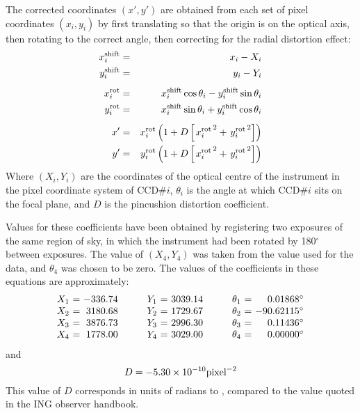 \documentclass[twoside,11pt]{starlink}
\begin{document}
The corrected coordinates $(x', y')$ are obtained from
each set of pixel coordinates $(x_i, y_i)$
by first translating so that the origin is on the optical
axis, then rotating to the correct angle,
then correcting for the radial distortion effect:
\begin{eqnarray*}
  x_i^{\rm shift} & = & x_i - X_i \\
  y_i^{\rm shift} & = & y_i - Y_i \\[1ex]
%
  x_i^{\rm rot}   & = & x_i^{\rm shift} \cos \theta_i
                      - y_i^{\rm shift} \sin \theta_i  \\
  y_i^{\rm rot}   & = & x_i^{\rm shift} \sin \theta_i
                      + y_i^{\rm shift} \cos \theta_i  \\[1ex]
%
  x'              & = & x_i^{\rm rot}
                        \left( 1 + D \left[ \left. x_i^{\rm rot} \right.^2
                                          + \left. y_i^{\rm rot} \right.^2
                                     \right] \right)  \\
  y'              & = & y_i^{\rm rot}
                        \left( 1 + D \left[ \left. x_i^{\rm rot} \right.^2
                                          + \left. y_i^{\rm rot} \right.^2
                                     \right] \right)
\end{eqnarray*}
Where $(X_i, Y_i)$ are the coordinates of the optical centre of
the instrument in the pixel coordinate system of CCD\#$i$,
$\theta_i$ is the angle at which CCD\#$i$ sits on the focal plane,
and $D$ is the pincushion distortion coefficient.

Values for these coefficients have been obtained by registering
two exposures of the same region of sky, in which the instrument
had been rotated by 180$^\circ$ between exposures.
The value of $(X_4, Y_4)$ was taken from the value used
for the
data, and $\theta_4$ was chosen to be zero.
The values of the coefficients in these equations are approximately:
\begin{displaymath}
  \begin{array}{c@{\ =\ }r@{\hspace{3em}}c@{\ =\ }r@{\hspace{3em}}c@{\ =\ }r}
     X_1 & -336.74  &  Y_1 & 3039.14  &  \theta_1 &   0.01868^\circ  \\
     X_2 & 3180.68  &  Y_2 & 1729.67  &  \theta_2 & -90.62115^\circ  \\
     X_3 & 3876.73  &  Y_3 & 2996.30  &  \theta_3 &   0.11436^\circ  \\
     X_4 & 1778.00  &  Y_4 & 3029.00  &  \theta_4 &   0.00000^\circ
  \end{array}
\end{displaymath}
and
\begin{displaymath}
     D = -5.30 \times 10^{-10} {\rm pixel}^{-2}
\end{displaymath}
This value of $D$ corresponds in units of radians to
,
compared to the value
quoted in the ING observer handbook.
\end{document}
